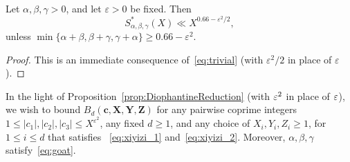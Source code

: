 \begin{proposition}\label{prop:TrivialBoundforSstar}
Let $\alpha,\beta,\gamma>0$, and let $\varepsilon>0$ be fixed. Then
\[
S^*_{\alpha,\beta,\gamma}(X)\ll X^{0.66-\varepsilon^2/2},
\]
unless $\min\{\alpha+\beta, \beta+\gamma,\gamma+\alpha\}\geq 0.66-\varepsilon^2$.
\end{proposition}

\begin{proof}
This is an immediate consequence of~\eqref{eq:trivial} (with $\varepsilon^2/2$ in place of $\varepsilon$).
\end{proof}


In the light of Proposition~\ref{prop:DiophantineReduction} (with $\varepsilon^2$ in place of $\varepsilon$), we wish to bound $B_d(\mathbf{c},\mathbf{X},\mathbf{Y},\mathbf{Z})$ for any
 pairwise coprime integers $1\leq |c_1|,|c_2|,|c_3|\leq X^{\varepsilon^2}$, any fixed $d\geq 1$,
 and any choice of
 $X_i,Y_i,Z_i\geq 1$, for $1\leq i\leq d$ that satisfies
~\eqref{eq:xiyizi_1} and~\eqref{eq:xiyizi_2}.
 Moreover,
 $
 \alpha,\beta,\gamma
 $ satisfy~\eqref{eq:goat}.

